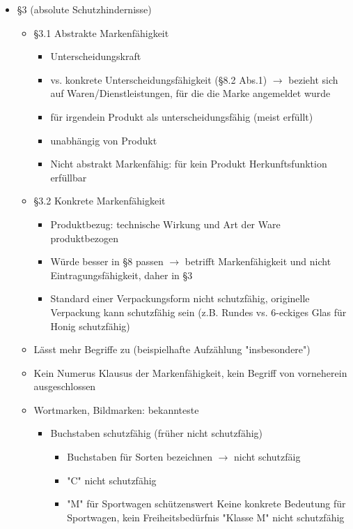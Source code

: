 \documentclass{report}
\begin{document}
\begin{itemize}
\begin{itemize}
	\end{itemize}
	\item §3 (absolute Schutzhindernisse)
	\begin{itemize}
		\item §3.1 Abstrakte Markenfähigkeit
		\begin{itemize}
			\item Unterscheidungskraft
			\item vs. konkrete Unterscheidungsfähigkeit (§8.2 Abs.1)
			\newline $\rightarrow$ bezieht sich auf Waren/Dienstleistungen, für die die Marke angemeldet wurde
			\item für irgendein Produkt als unterscheidungsfähig (meist erfüllt)
			\item unabhängig von Produkt
			\item Nicht abstrakt Markenfähig: für kein Produkt Herkunftsfunktion erfüllbar
		\end{itemize}
		\item §3.2 Konkrete Markenfähigkeit
		\begin{itemize}
			\item Produktbezug: technische Wirkung und Art der Ware produktbezogen
			\item Würde besser in §8 passen $\rightarrow$ betrifft Markenfähigkeit und nicht Eintragungsfähigkeit, daher in §3
			\item Standard einer Verpackungsform nicht schutzfähig, originelle Verpackung kann schutzfähig sein (z.B. Rundes vs. 6-eckiges Glas für Honig schutzfähig)
		\end{itemize}
		\item Lässt mehr Begriffe zu (beispielhafte Aufzählung "insbesondere")
		\item Kein Numerus Klausus der Markenfähigkeit, kein Begriff von vorneherein ausgeschlossen
		\item Wortmarken, Bildmarken: bekannteste
		\begin{itemize}
			\item Buchstaben schutzfähig (früher nicht schutzfähig)
			\begin{itemize}
				\item Buchstaben für Sorten bezeichnen $\rightarrow$ nicht schutzfäig
				\item "C" nicht schutzfähig
				\item "M" für Sportwagen schützenswert
				\newline Keine konkrete Bedeutung für Sportwagen, kein Freiheitsbedürfnis
				\newline "Klasse M" nicht schutzfähig

\end{itemize}
\end{itemize}
\end{itemize}
\end{itemize}
\end{document}
